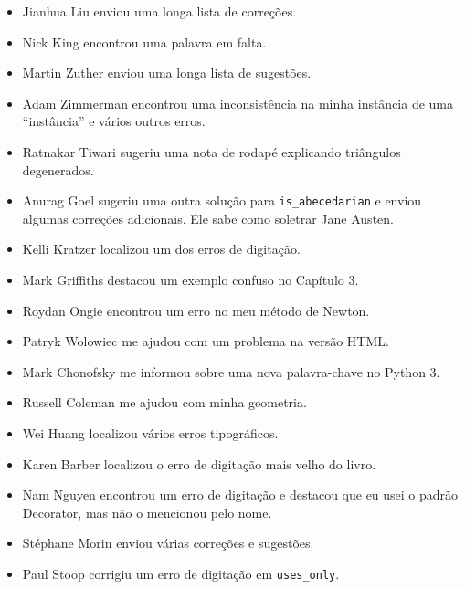 \documentclass[10pt]{book}
\begin{document}
\begin {itemize}
\item Jianhua Liu enviou uma longa lista de correções.

\item Nick King encontrou uma palavra em falta.

\item Martin Zuther enviou uma longa lista de sugestões.

\item Adam Zimmerman encontrou uma inconsistência na minha instância
de uma ``instância'' e vários outros erros.

\item Ratnakar Tiwari sugeriu uma nota de rodapé explicando triângulos
degenerados.

\item Anurag Goel sugeriu uma outra solução para \verb"is_abecedarian"
e enviou algumas correções adicionais. Ele sabe como
soletrar Jane Austen.

\item Kelli Kratzer localizou um dos erros de digitação.

\item Mark Griffiths destacou um exemplo confuso no Capítulo 3.

\item Roydan Ongie encontrou um erro no meu método de Newton.

\item Patryk Wolowiec me ajudou com um problema na versão HTML.

\item Mark Chonofsky me informou sobre uma nova palavra-chave no Python 3.

\item Russell Coleman me ajudou com minha geometria.

\item Wei Huang localizou vários erros tipográficos.

\item Karen Barber localizou o erro de digitação mais velho do livro.

\item Nam Nguyen encontrou um erro de digitação e destacou que eu usei o padrão
Decorator, mas não o mencionou pelo nome.

\item St\'{e}phane Morin enviou várias correções e sugestões.

\item Paul Stoop corrigiu um erro de digitação em \verb+uses_only+.


\end{itemize}
\end{document}
